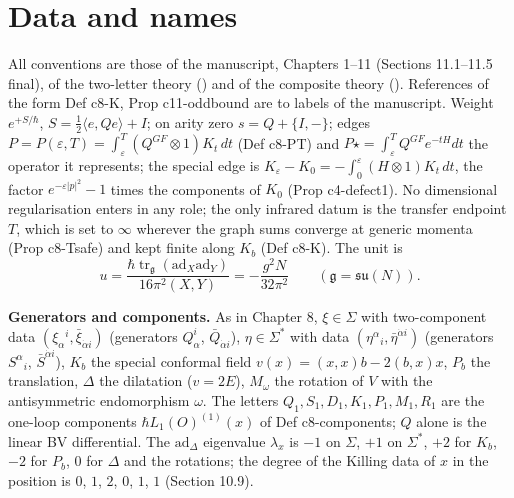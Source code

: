 \section{Data and names}
\label{sec:qs-data}

All conventions are those of the manuscript, Chapters 1--11 (Sections 11.1--11.5 final), of the two-letter theory () and of the composite theory (). References of the form Def c8-K, Prop c11-oddbound are to labels of the manuscript. Weight $e^{+S/\hbar}$, $S=\tfrac12\langle e,Qe\rangle+I$; on arity zero $s=Q+\{I,-\}$; edges $P=P(\varepsilon,T)=\int_\varepsilon^T(Q^{GF}\otimes1)K_t\,dt$ (Def c8-PT) and $P\star=\int_\varepsilon^TQ^{GF}e^{-tH}dt$ the operator it represents; the special edge is $K_\varepsilon-K_0=-\int_0^\varepsilon(H\otimes1)K_t\,dt$, the factor $e^{-\varepsilon|p|^2}-1$ times the components of $K_0$ (Prop c4-defect1). No dimensional regularisation enters in any role; the only infrared datum is the transfer endpoint $T$, which is set to $\infty$ wherever the graph sums converge at generic momenta (Prop c8-Tsafe) and kept finite along $K_b$ (Def c8-K). The unit is
\[
u=\frac{\hbar\operatorname{tr}_{\mathfrak g}(\mathrm{ad}_X\mathrm{ad}_Y)}{16\pi^2(X,Y)}=-\frac{g^2N}{32\pi^2}\qquad(\mathfrak g=\mathfrak{su}(N)).
\]

\textbf{Generators and components.} As in Chapter 8, $\xi\in\Sigma$ with two-component data $(\xi_\alpha{}^i,\bar\xi_{\dot\alpha i})$ (generators $Q^i_\alpha$, $\bar Q_{\dot\alpha i}$), $\eta\in\Sigma^*$ with data $(\eta^\alpha{}_i,\bar\eta^{\dot\alpha i})$ (generators $S^\alpha{}_i$, $\bar S^{\dot\alpha i}$), $K_b$ the special conformal field $v(x)=(x,x)b-2(b,x)x$, $P_b$ the translation, $\Delta$ the dilatation ($v=2E$), $M_\omega$ the rotation of $V$ with the antisymmetric endomorphism $\omega$. The letters $Q_1,S_1,D_1,K_1,P_1,M_1,R_1$ are the one-loop components $\hbar L_1(O)^{(1)}(x)$ of Def c8-components; $Q$ alone is the linear BV differential. The $\mathrm{ad}_\Delta$ eigenvalue $\lambda_x$ is $-1$ on $\Sigma$, $+1$ on $\Sigma^*$, $+2$ for $K_b$, $-2$ for $P_b$, $0$ for $\Delta$ and the rotations; the degree of the Killing data of $x$ in the position is $0$, $1$, $2$, $0$, $1$, $1$ (Section 10.9).

